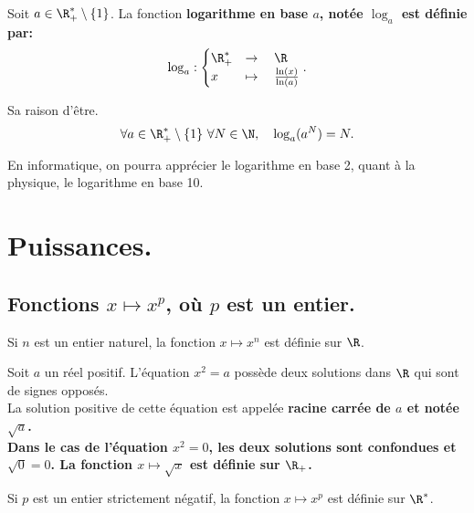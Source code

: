 \documentclass[11pt]{article}
\begin{document}
\begin{defi}{}{}
    Soit $a\in\R^*_+\setminus\{1\}$. La fonction \bf{logarithme en base $a$}, notée $\log_a$ est définie par:
    \begin{equation*}
        \log_a:\begin{cases}
            \R_+^*&\to\quad\R\\
            x&\mapsto\quad\frac{\ln(x)}{\ln(a)}
        \end{cases}.
    \end{equation*}
\end{defi}

\begin{prop}{Sa raison d'être.}{}
    \begin{equation*}
        \forall a \in \R^*_+\setminus\{1\} ~\forall N\in\N,\quad\log_a(a^N)=N.
    \end{equation*}
\end{prop}

En informatique, on pourra apprécier le logarithme en base 2, quant à la physique, le logarithme en base 10.

\section{Puissances.}

\subsection{Fonctions \texorpdfstring{$x\mapsto x^p$}{Lg}, où \texorpdfstring{$p$}{Lg} est un entier.}

\begin{defi}{}{}
    Si $n$ est un entier naturel, la fonction $x\mapsto x^n$ est définie sur $\R$.
\end{defi}

\begin{defi}{}{}
    Soit $a$ un réel positif. L'équation $x^2=a$ possède deux solutions dans $\R$ qui sont de signes opposés.\\
    La solution positive de cette équation est appelée \bf{racine carrée} de $a$ et notée $\sqrt{a}$.\\
    Dans le cas de l'équation $x^2=0$, les deux solutions sont confondues et $\sqrt{0}=0$.\n
    La fonction $x\mapsto\sqrt{x}$ est définie sur $\R_+$.
\end{defi}

\begin{defi}{}{}
    Si $p$ est un entier strictement négatif, la fonction $x\mapsto x^p$ est définie sur $\R^*$.
\end{defi}
\end{document}
